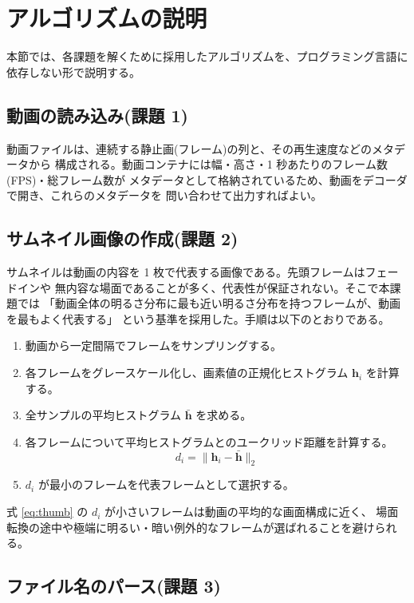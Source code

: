\section{アルゴリズムの説明}

本節では、各課題を解くために採用したアルゴリズムを、プログラミング言語に依存しない形で説明する。

\subsection{動画の読み込み(課題 1)}

動画ファイルは、連続する静止画(フレーム)の列と、その再生速度などのメタデータから
構成される。動画コンテナには幅・高さ・1 秒あたりのフレーム数(FPS)・総フレーム数が
メタデータとして格納されているため、動画をデコーダで開き、これらのメタデータを
問い合わせて出力すればよい。

\subsection{サムネイル画像の作成(課題 2)}

サムネイルは動画の内容を 1 枚で代表する画像である。先頭フレームはフェードインや
無内容な場面であることが多く、代表性が保証されない。そこで本課題では
「動画全体の明るさ分布に最も近い明るさ分布を持つフレームが、動画を最もよく代表する」
という基準を採用した。手順は以下のとおりである。

\begin{enumerate}
\item 動画から一定間隔でフレームをサンプリングする。
\item 各フレームをグレースケール化し、画素値の正規化ヒストグラム
      $\boldsymbol{h}_i$ を計算する。
\item 全サンプルの平均ヒストグラム $\bar{\boldsymbol{h}}$ を求める。
\item 各フレームについて平均ヒストグラムとのユークリッド距離を計算する。
\begin{equation}\label{eq:thumb}
d_i = \| \boldsymbol{h}_i - \bar{\boldsymbol{h}} \|_2
\end{equation}
\item $d_i$ が最小のフレームを代表フレームとして選択する。
\end{enumerate}

式 \ref{eq:thumb} の $d_i$ が小さいフレームは動画の平均的な画面構成に近く、
場面転換の途中や極端に明るい・暗い例外的なフレームが選ばれることを避けられる。

\subsection{ファイル名のパース(課題 3)}

